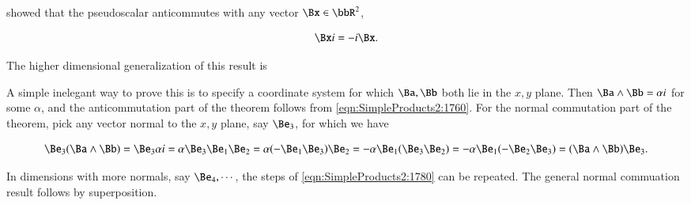  showed that the  pseudoscalar anticommutes with any vector \( \Bx \in \bbR^{2} \),

\begin{dmath}\label{eqn:SimpleProducts2:1760}
\Bx i = -i \Bx.
\end{dmath}

The higher dimensional generalization of this result is


A simple inelegant way to prove this is to specify a coordinate system for which \( \Ba, \Bb \) both lie in the \( x,y \) plane.  Then \( \Ba \wedge \Bb = \alpha i \) for some \( \alpha \), and the anticommutation part of the theorem follows from
\cref{eqn:SimpleProducts2:1760}.  For the normal commutation part of the theorem, pick any vector normal to the \(x, y\) plane, say \( \Be_3\), for which we have

\begin{dmath}\label{eqn:SimpleProducts2:1780}
\Be_3  (\Ba \wedge \Bb)
=
\Be_3 \alpha i
=
\alpha \Be_3 \Be_1 \Be_2
=
\alpha (-\Be_1 \Be_3) \Be_2
=
-\alpha \Be_1 (\Be_3 \Be_2)
=
-\alpha \Be_1 (-\Be_2 \Be_3)
= (\Ba \wedge \Bb) \Be_3.
\end{dmath}

In dimensions with more normals, say \( \Be_4, \cdots \), the steps of \cref{eqn:SimpleProducts2:1780} can be repeated.  The general normal commuation result follows by superposition.
